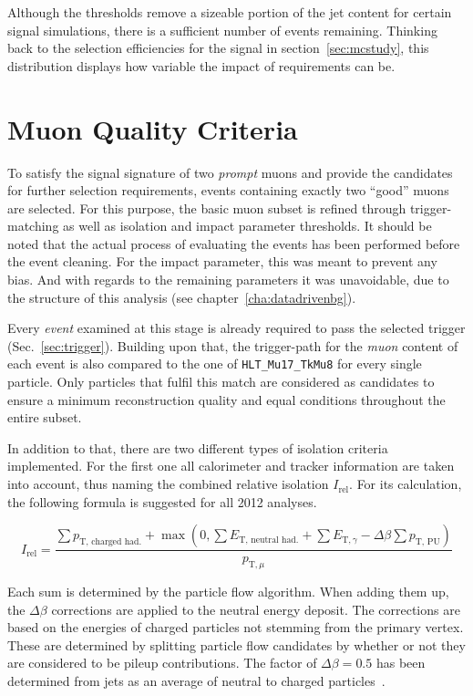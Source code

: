 \noindent Although the thresholds remove a sizeable portion of the jet content for certain signal simulations, there is a sufficient number of events remaining. Thinking back to the selection efficiencies for the signal in section~\ref{sec:mcstudy}, this distribution displays how variable the impact of requirements can be.
 

\section{Muon Quality Criteria}
\label{sec:muonqualy}

To satisfy the signal signature of two \textit{prompt} muons and provide the candidates for further selection requirements, events containing exactly two ``good'' muons are selected. For this purpose, the basic muon subset is refined through trigger-matching as well as isolation and impact parameter thresholds. It should be noted that the actual process of evaluating the events has been performed before the event cleaning. For the impact parameter, this was meant to prevent any bias. And with regards to the remaining parameters it was unavoidable, due to the structure of this analysis (see chapter~\ref{cha:datadrivenbg}).

Every \textit{event} examined at this stage is already required to pass the selected trigger (Sec.~\ref{sec:trigger}). Building upon that, the trigger-path for the \textit{muon} content of each event is also compared to the one of \verb+HLT_Mu17_TkMu8+ for every single particle. Only particles that fulfil this match are considered as candidates to ensure a minimum reconstruction quality and equal conditions throughout the entire subset. 

In addition to that, there are two different types of isolation criteria implemented. For the first one all calorimeter and tracker information are taken into account, thus naming the combined relative isolation $I_{\text{rel}}$. For its calculation, the following formula is suggested for all 2012 analyses.

\begin{equation}
  \label{eq:reliso}
  I_{\text{rel}} = \frac{ \sum p_{\text{T, charged had.}} + \max \left( 0,  \sum E_{\text{T, neutral had.}} + \sum E_{\text{T}, \gamma} - \Delta\beta \sum p_{\text{T, PU}} \right) }{ p_{\text{T}, \mu} }
\end{equation}

Each sum is determined by the particle flow algorithm. When adding them up, the $\Delta \beta$ corrections are applied to the neutral energy deposit. The corrections are based on the energies of charged particles not stemming from the primary vertex. These are determined by splitting particle flow candidates by whether or not they are considered to be pileup contributions. The factor of $\Delta \beta = 0.5$ has been determined from jets as an average of neutral to charged particles~\cite{muondbeta}.

